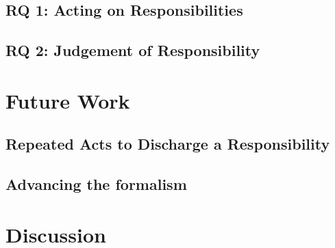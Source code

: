 \subsection{RQ 1: Acting on Responsibilities}

\subsection{RQ 2: Judgement of Responsibility}



\section{Future Work}

\subsection{Repeated Acts to Discharge a Responsibility}

\subsection{Advancing the formalism}


\section{Discussion}





